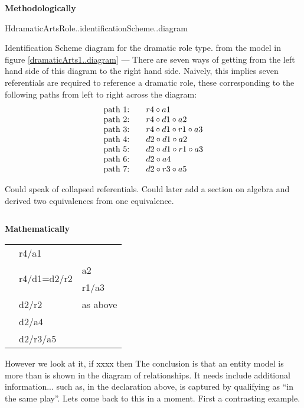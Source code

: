 \begin{worktt}
\textbf{Methodologically}
\begin{erboxedFigure}{H}{dramaticArtsRole..identificationScheme..diagram}
{Identification Scheme diagram for the dramatic role type.
from the model in figure \ref{dramaticArts1..diagram} ---
There are seven ways of getting from the left hand side of this diagram to the right hand side. Naively, this implies seven referentials are required to reference a dramatic role, these corresponding to the following paths from left to right across the diagram:
\begin{displaymath}
\begin{array}{l c l}
\text{path 1:} &  & r4 \circ a1 \\
\text{path 2:} & & r4 \circ d1 \circ a2 \\
\text{path 3:} & & r4 \circ d1 \circ r1 \circ a3 \\
\text{path 4:} &  & d2 \circ d1 \circ a2 \\
\text{path 5:} &  & d2 \circ d1 \circ r1 \circ a3 \\
\text{path 6:} &  & d2 \circ a4 \\
\text{path 7:} &  & d2 \circ r3 \circ a5
\end{array}
\end{displaymath}


Could speak of collapsed referentials.
Could later add a section on algebra and derived two equivalences from one equivalence.
} %
\begin{equation*}

\end{equation*}
\end{erboxedFigure}
\mynote

\textbf{Mathematically}
\begin{tabular}{l l l}
& r4/a1 &    \\
& \multirow[t]{2}{1cm}{r4/d1=d2/r2} & a2  \\
&                                 & r1/a3 \\
& d2/r2    & as above\\
& d2/a4 &            \\
& d2/r3/a5 &      
\end{tabular}

\end{worktt}

\begin{reinstatett}
\mynote
However we look at it, if xxxx then The conclusion is that an entity model is more than is shown in the diagram of relationships. It needs include additional information... such as, in the declaration above,
 is captured by qualifying as ``in the same play''. Lets come back to this in a moment. First a contrasting example.
 \end{reinstatett} 

